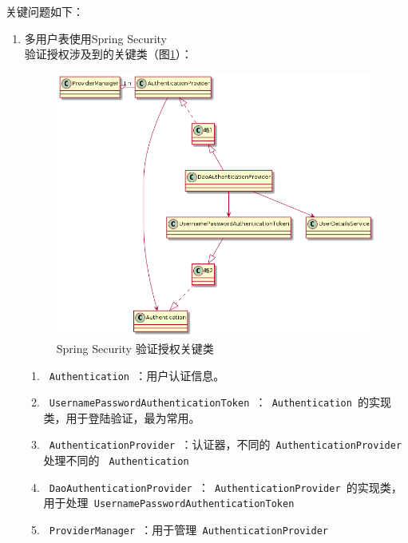 关键问题如下：
\begin{enumerate}
    \item 多用户表使用Spring Security\\
          验证授权涉及到的关键类（图\ref{SpringSecurity}）：
          \begin{figure}[h]
              \centering
              \includegraphics[scale = 0.5]{out/uml/类图/Spring Security/SpringSecurity验证/SpringSecurity验证.png}
              \caption{\song\wuhao Spring Security 验证授权关键类}
              \label{SpringSecurity}
          \end{figure}
          \begin{enumerate}
              \item \lstinline[language = Java]| Authentication |：用户认证信息。
              \item \lstinline[language = Java]| UsernamePasswordAuthenticationToken |：\lstinline[language = Java]| Authentication |的实现类，用于登陆验证，最为常用。
              \item \lstinline[language = Java]| AuthenticationProvider |：认证器，不同的\lstinline[language = Java]| AuthenticationProvider | 处理不同的 \lstinline[language = Java]| Authentication |
              \item \lstinline[language = Java]| DaoAuthenticationProvider |：\lstinline[language = Java]| AuthenticationProvider |的实现类，用于处理\lstinline[language = Java]| UsernamePasswordAuthenticationToken |
              \item \lstinline[language = Java]| ProviderManager |：用于管理\lstinline[language = Java]| AuthenticationProvider |

\end{enumerate}
\end{enumerate}
